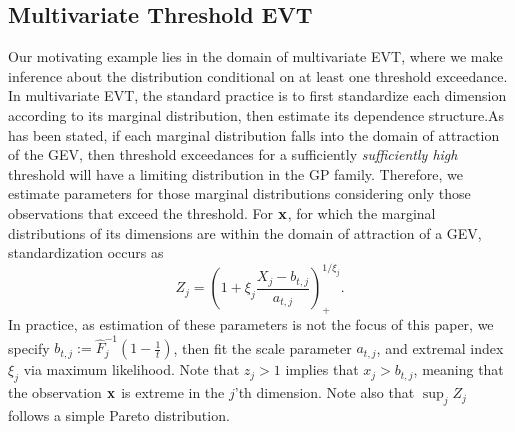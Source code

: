 \subsection{Multivariate Threshold EVT}

Our motivating example lies in the domain of multivariate EVT, where we make inference about the
  distribution conditional on at least one threshold exceedance.  In multivariate EVT, the standard
  practice is to first standardize each dimension according to its marginal distribution, then
  estimate its dependence structure.\findcite  As has been stated, if each marginal distribution falls
  into the domain of attraction of the GEV, then threshold exceedances for a sufficiently
  \emph{sufficiently high} threshold will have a limiting distribution in the GP family\cite{beirlant2006}.
  Therefore, we estimate parameters for those marginal distributions considering only those
  observations that exceed the threshold.  For ${\bf x}$, for which the marginal distributions of its
  dimensions are within the domain of attraction of a GEV, standardization occurs as
  \begin{equation}
    Z_j = \left(1 + \xi_j\frac{X_j - b_{t,j}}{a_{t,j}}\right)_{+}^{1/\xi_j}.
  \end{equation}
  In practice, as estimation of these parameters is not the focus of this paper, we specify 
  $b_{t,j} := \hat{F}_j^{-1}\left(1 - \frac{1}{t}\right)$, then fit the scale parameter $a_{t,j}$,
  and extremal index $\xi_j$ via maximum likelihood.  Note that $z_j > 1$ implies that $x_j > b_{t,j}$,
  meaning that the observation ${\bf x}$ is extreme in the $j$'th dimension.  Note also that
  $\sup_j Z_j$ follows a simple Pareto distribution.

